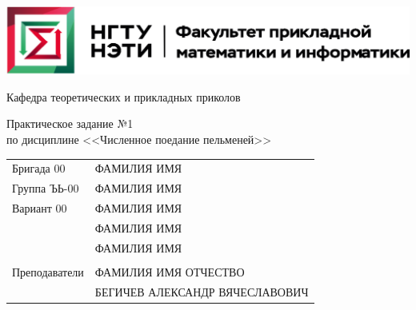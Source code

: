 \documentclass[12pt,a4paper]{article}
\begin{document}
\begin{center}
\begin{large}
\vspace{12mm}




\vspace{4mm}

\includegraphics[scale=0.8]{pic/logo_fami}

\vspace{12mm}


Кафедра теоретических и прикладных приколов

\vspace{4mm}


Практическое задание №1 \\ %
по дисциплине <<Численное поедание пельменей>> \\ %
\bigskip
\textbf{} %

\vspace{8mm}

\end{large}




\renewcommand{\arraystretch}{1.7}
\begin{tabular}{ll}
Бригада 00				& \uppercase{Фамилия Имя} \\
Группа ЪЬ-00			& \uppercase{Фамилия Имя} \\
Вариант 00				& \uppercase{Фамилия Имя} \\
						& \uppercase{Фамилия Имя} \\
						& \uppercase{Фамилия Имя} \\
						& \\
Преподаватели			& \uppercase{Фамилия Имя Отчество} \\
						& \uppercase{Бегичев Александр Вячеславович} \\
\end{tabular}
\renewcommand{\arraystretch}{1.0}


\end{center}
\end{document}
